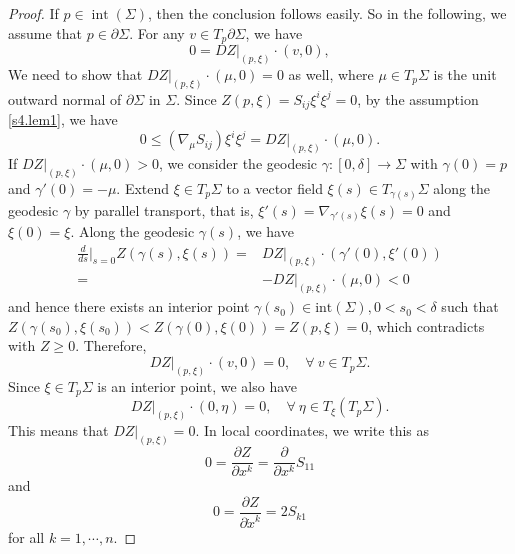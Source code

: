 \documentclass[10pt,a4paper]{amsart}
\begin{document}
\begin{proof}
If $p\in\operatorname{int}(\Sigma)$, then the conclusion follows easily. So in the following, we assume that $p\in\partial\Sigma$. For any $v\in T_p \partial\Sigma$, we have
   \begin{equation*}
	0=DZ|_{(p,\xi)}\cdot \left(v,0\right),
	\end{equation*}
	We need to show that $DZ|_{(p,\xi)}\cdot \left(\mu,0\right)=0$ as well, where $\mu\in T_p\Sigma$ is the unit outward normal of $\partial\Sigma$ in $\Sigma$. Since $Z(p,\xi)=S_{ij}\xi^i\xi^j=0$,  by the assumption \eqref{s4.lem1}, we have
	\begin{equation*}
	0\leq \left(\nabla_\mu S_{ij}\right)\xi^i\xi^j=DZ|_{(p,\xi)}\cdot \left(\mu,0\right).
	\end{equation*}
If $DZ|_{(p,\xi)}\cdot \left(\mu,0\right)>0$, we consider the geodesic $\gamma:[0,\delta]\rightarrow \Sigma$ with $\gamma(0)=p$ and $\gamma'(0)=-\mu$. Extend $\xi\in T_p\Sigma$ to a vector field $\xi(s)\in T_{\gamma(s)}\Sigma$ along the geodesic $\gamma$ by parallel transport, that is, $\xi'(s)=\nabla_{\gamma'(s)}\xi(s)=0$ and $\xi(0)=\xi$.  Along the geodesic $\gamma(s)$, we have
\begin{align*}
  \frac{d}{ds}\Big |_{s=0}Z(\gamma(s),\xi(s))=&DZ|_{(p,\xi)}\cdot (\gamma'(0),\xi'(0))\\
  =&-DZ|_{(p,\xi)}\cdot \left(\mu,0\right)<0
\end{align*}
 and hence there exists an interior point $\gamma(s_0)\in\text{int}(\Sigma), 0<s_0<\delta$ such that $Z(\gamma(s_0),\xi(s_0))<Z(\gamma(0),\xi(0))=Z(p,\xi)=0$, which contradicts with $Z\geq 0$. Therefore,
 \begin{equation*}
   DZ|_{(p,\xi)}\cdot (v,0)=0,\quad \forall~v\in T_p\Sigma.
 \end{equation*}
 Since $\xi\in T_p\Sigma$ is an interior point, we also have
  \begin{equation*}
   DZ|_{(p,\xi)}\cdot (0,\eta)=0,\quad \forall~\eta\in T_\xi(T_p\Sigma).
 \end{equation*}
 This means that $DZ|_{(p,\xi)}=0$. In local coordinates, we write this as
	\begin{equation*}
	0=\frac{\partial Z}{\partial x^k}=\frac{\partial}{\partial x^k}S_{11}
	\end{equation*}
and
	\begin{equation*}
	0=\frac{\partial Z}{\partial \dot{x}^k}=2S_{k1}
	\end{equation*}
	for all $k=1,\cdots,n$.


\end{proof}
\end{document}

